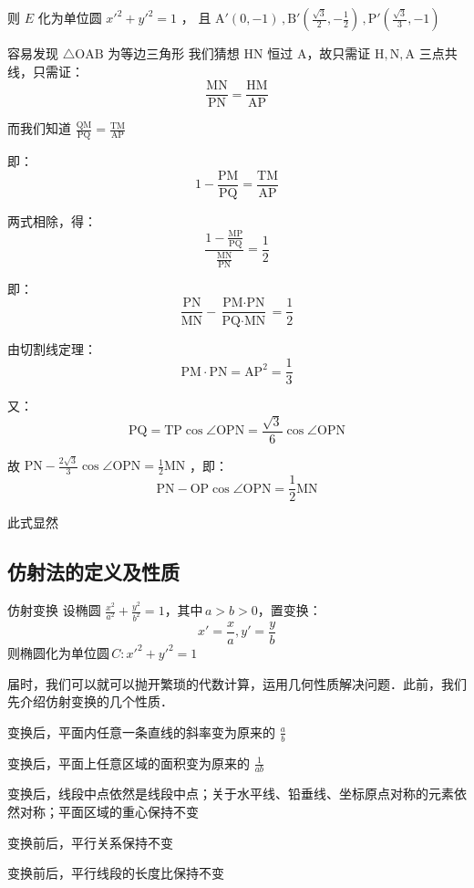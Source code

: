 \begin{corollary}{}
则 $\displaystyle{E}$ 化为单位圆 $\displaystyle{x'^2+y'^2=1}$ ， 且 $\displaystyle{\text{A}'(0,-1)\,,\text{B}'\left(\frac{\sqrt{3}}{2},-\frac{1}{2}\right)\,,\text{P}'\left(\frac{\sqrt{3}}{3},-1\right)}$

容易发现 $\displaystyle{\triangle \text{OAB}}$ 为等边三角形
我们猜想 $\displaystyle{\text{HN}}$ 恒过 $\displaystyle{\text{A}}$，故只需证 $\displaystyle{\text{H},\text{N},\text{A}}$ 三点共线，只需证：
$$\frac{\text{MN}}{\text{PN}}=\frac{\text{HM}}{\text{AP}}$$

而我们知道 $\displaystyle{\frac{\text{QM}}{\text{PQ}}=\frac{\text{TM}}{\text{AP}}}$ 

即：
$$1-\frac{\text{PM}}{\text{PQ}}=\frac{\text{TM}}{\text{AP}}$$

两式相除，得：
$$\frac{1-\frac{\text{MP}}{\text{PQ}}}{\frac{\text{MN}}{\text{PN}}}=\frac{1}{2}$$

即：
$$\frac{\text{PN}}{\text{MN}}-\frac{\text{PM}\cdot\text{PN}}{\text{PQ}\cdot\text{MN}}=\frac{1}{2}$$

由切割线定理：
$${\text{PM}}\cdot{\text{PN}}=\text{AP}^2=\frac{1}3$$

又：
$$\text{PQ}=\text{TP}\cos\angle\text{OPN}=\frac{\sqrt{3}}{6}\cos\angle\text{OPN}$$

故 $\displaystyle{\text{PN}-\frac{2\sqrt{3}}{3}\cos\angle\text{OPN}=\frac{1}{2}\text{MN}}$ ，即：
$$\text{PN}-\text{OP}\cos\angle\text{OPN}=\frac{1}{2}\text{MN}$$

此式显然
\subsection{仿射法的定义及性质}
\begin{definition}{仿射变换}
设椭圆 $\displaystyle{\frac{x^2}{a^2}+\frac{y^2}{b^2}=1}$，其中\,$\displaystyle{a>b>0}$，置变换：
$$x'=\frac{x}{a},y'=\frac{y}{b}$$
则椭圆化为单位圆\,$\displaystyle{C:x'^2+y'^2=1}$
\end{definition}
届时，我们可以就可以抛开繁琐的代数计算，运用几何性质解决问题．此前，我们先介绍仿射变换的几个性质．
\begin{lemma}{}
变换后，平面内任意一条直线的斜率变为原来的 $\displaystyle{\frac{a}{b}}$
\end{lemma}
\begin{lemma}{}
变换后，平面上任意区域的面积变为原来的 $\displaystyle{\frac1{ab}}$
\end{lemma}
\begin{lemma}{}
变换后，线段中点依然是线段中点；关于水平线、铅垂线、坐标原点对称的元素依然对称；平面区域的重心保持不变
\end{lemma}
\begin{lemma}{}
变换前后，平行关系保持不变
\end{lemma}
\begin{lemma}{}
变换前后，平行线段的长度比保持不变
\end{lemma}

\end{corollary}
